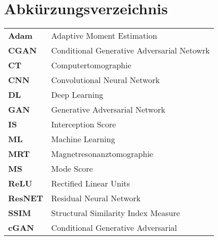 
\chapter*{Abkürzungsverzeichnis}
\begin{longtable}{ll}
\textbf{Adam} & Adaptive Moment Estimation \\
\textbf{CGAN} & Conditional Generative Adversarial Netowrk \\
\textbf{CT} & Computertomographie \\
\textbf{CNN} & Convolutional Neural Network \\
\textbf{DL} & Deep Learning \\
\textbf{GAN}  & Generative Adversarial Network \\ 
\textbf{IS} & Interception Score \\
\textbf{ML} & Machine Learning\\
\textbf{MRT} & Magnetresonanztomographie \\
\textbf{MS} & Mode Score\\
\textbf{ReLU} & Rectified Linear Units\\
\textbf{ResNET} & Residual Neural Network\\
\textbf{SSIM} & Structural Similarity Index Measure\\
\textbf{cGAN} & Conditional Generative Adversarial\\
\end{longtable}

\cleardoublepage